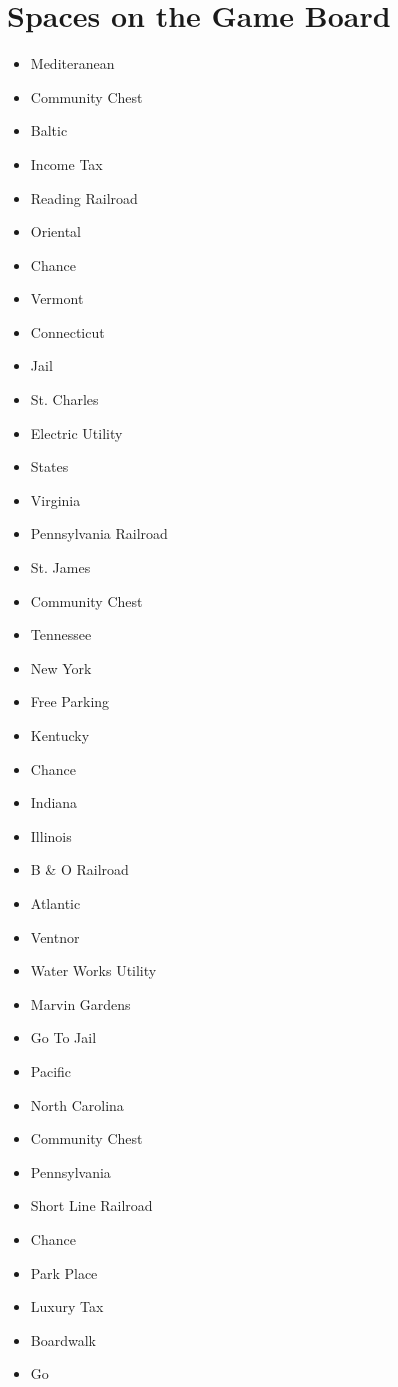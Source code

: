 \documentclass[11pt]{exam}
\begin{document}
\newpage
\twocolumn

\section*{Spaces on the Game Board}
\begin{itemize}
  \item Mediteranean
  \item Community Chest
  \item Baltic
  \item Income Tax
  \item Reading Railroad
  \item Oriental
  \item Chance
  \item Vermont
  \item Connecticut
  \item Jail
  \item St. Charles
  \item Electric Utility
  \item States
  \item Virginia
  \item Pennsylvania Railroad
  \item St. James
  \item Community Chest
  \item Tennessee
  \item New York
  \item Free Parking
  \item Kentucky
  \item Chance
  \item Indiana
  \item Illinois
  \item B \& O Railroad
  \item Atlantic
  \item Ventnor
  \item Water Works Utility
  \item Marvin Gardens
  \item Go To Jail
  \item Pacific
  \item North Carolina
  \item Community Chest
  \item Pennsylvania
  \item Short Line Railroad
  \item Chance
  \item Park Place
  \item Luxury Tax
  \item Boardwalk
  \item Go
\end{itemize}
\end{document}
